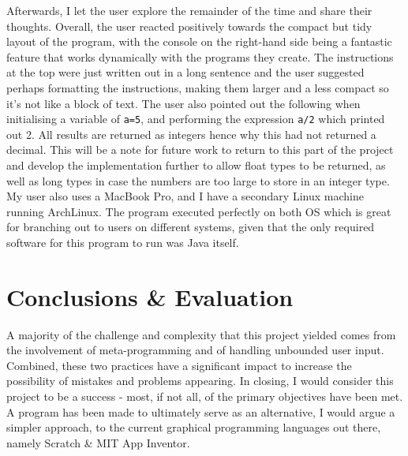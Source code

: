 \documentclass[a4paper, 12pt]{article}
\begin{document}
        Afterwards, I let the user explore the remainder of the time and share their thoughts. Overall, the
        user reacted positively towards the compact but tidy layout of the program, with the console on the
        right-hand side being a fantastic feature that works dynamically with the programs they create. The
        instructions at the top were just written out in a long sentence and the user suggested perhaps
        formatting the instructions, making them larger and a less compact so it's not like a block of text.
        The user also pointed out the following when initialising a variable of \texttt{a=5}, and performing
        the expression \texttt{a/2} which printed out 2. All results are returned as integers hence why this
        had not returned a decimal. This will be a note for future work to return to this part of the project
        and develop the implementation further to allow float types to be returned, as well as long types
        in case the numbers are too large to store in an integer type. \\

        My user also uses a MacBook Pro, and I have a secondary Linux machine running ArchLinux. The program
        executed perfectly on both OS which is great for branching out to users on different systems, given
        that the only required software for this program to run was Java itself.

    \clearpage
    \section{Conclusions \& Evaluation}
        A majority of the challenge and complexity that this project yielded comes from the
        involvement of meta-programming and of handling unbounded user input. Combined, these
        two practices have a significant impact to increase the possibility of mistakes and
        problems appearing. In closing, I would consider this project to be a success - most,
        if not all, of the primary objectives have been met. A program has been made to
        ultimately serve as an alternative, I would argue a simpler approach, to the
        current graphical programming languages out there, namely Scratch \& MIT App Inventor. \\
\end{document}
